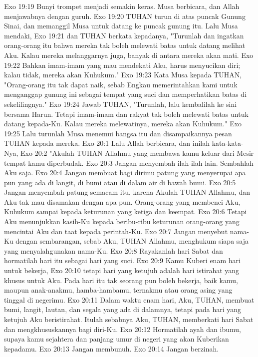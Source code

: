 Exo 19:19  Bunyi trompet menjadi semakin keras. Musa berbicara, dan Allah menjawabnya dengan guruh.
Exo 19:20  TUHAN turun di atas puncak Gunung Sinai, dan memanggil Musa untuk datang ke puncak gunung itu. Lalu Musa mendaki,
Exo 19:21  dan TUHAN berkata kepadanya, "Turunlah dan ingatkan orang-orang itu bahwa mereka tak boleh melewati batas untuk datang melihat Aku. Kalau mereka melanggarnya juga, banyak di antara mereka akan mati.
Exo 19:22  Bahkan imam-imam yang mau mendekati Aku, harus menyucikan diri; kalau tidak, mereka akan Kuhukum."
Exo 19:23  Kata Musa kepada TUHAN, "Orang-orang itu tak dapat naik, sebab Engkau memerintahkan kami untuk menganggap gunung ini sebagai tempat yang suci dan memperhatikan batas di sekelilingnya."
Exo 19:24  Jawab TUHAN, "Turunlah, lalu kembalilah ke sini bersama Harun. Tetapi imam-imam dan rakyat tak boleh melewati batas untuk datang kepada-Ku. Kalau mereka melewatinya, mereka akan Kuhukum."
Exo 19:25  Lalu turunlah Musa menemui bangsa itu dan disampaikannya pesan TUHAN kepada mereka.
Exo 20:1  Lalu Allah berbicara, dan inilah kata-kata-Nya,
Exo 20:2  "Akulah TUHAN Allahmu yang membawa kamu keluar dari Mesir tempat kamu diperbudak.
Exo 20:3  Jangan menyembah ilah-ilah lain. Sembahlah Aku saja.
Exo 20:4  Jangan membuat bagi dirimu patung yang menyerupai apa pun yang ada di langit, di bumi atau di dalam air di bawah bumi.
Exo 20:5  Jangan menyembah patung semacam itu, karena Akulah TUHAN Allahmu, dan Aku tak mau disamakan dengan apa pun. Orang-orang yang membenci Aku, Kuhukum sampai kepada keturunan yang ketiga dan keempat.
Exo 20:6  Tetapi Aku menunjukkan kasih-Ku kepada beribu-ribu keturunan orang-orang yang mencintai Aku dan taat kepada perintah-Ku.
Exo 20:7  Jangan menyebut nama-Ku dengan sembarangan, sebab Aku, TUHAN Allahmu, menghukum siapa saja yang menyalahgunakan nama-Ku.
Exo 20:8  Rayakanlah hari Sabat dan hormatilah hari itu sebagai hari yang suci.
Exo 20:9  Kamu Kuberi enam hari untuk bekerja,
Exo 20:10  tetapi hari yang ketujuh adalah hari istirahat yang khusus untuk Aku. Pada hari itu tak seorang pun boleh bekerja, baik kamu, maupun anak-anakmu, hamba-hambamu, ternakmu atau orang asing yang tinggal di negerimu.
Exo 20:11  Dalam waktu enam hari, Aku, TUHAN, membuat bumi, langit, lautan, dan segala yang ada di dalamnya, tetapi pada hari yang ketujuh Aku beristirahat. Itulah sebabnya Aku, TUHAN, memberkati hari Sabat dan mengkhususkannya bagi diri-Ku.
Exo 20:12  Hormatilah ayah dan ibumu, supaya kamu sejahtera dan panjang umur di negeri yang akan Kuberikan kepadamu.
Exo 20:13  Jangan membunuh.
Exo 20:14  Jangan berzinah.
